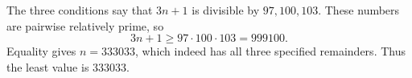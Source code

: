 The three conditions say that $3n+1$ is divisible by $97,100,103$. These numbers are pairwise relatively prime, so
\[
3n+1\ge97\cdot100\cdot103=999100.
\]
Equality gives $n=333033$, which indeed has all three specified remainders. Thus the least value is $\boxed{333033}$.
